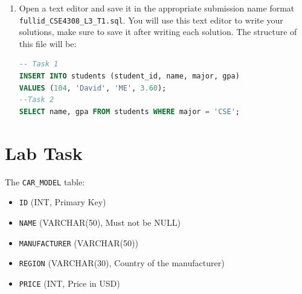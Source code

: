 \documentclass[12pt,a4paper]{article}
\begin{document}
\begin{enumerate}
After loading the SQL file, reconnect to PostgreSQL to verify that the tables have been created.

1. Reconnect to Your Database:

   \begin{lstlisting}[language=SQL]
   psql -h localhost -U student_12345 -d cse4308_12345
   \end{lstlisting}

2. Check Tables:

   Verify the tables have been created by listing them:

   \begin{lstlisting}[language=SQL]
   \dt
   \end{lstlisting}

3. View Table Data:

   Verify the data by running the following SQL queries:

   \begin{lstlisting}[language=SQL]
   SELECT * FROM <table_name>;
   \end{lstlisting}

\item Open a text editor and save it in the appropriate submission name format \\ \texttt{fullid\_CSE4308\_L3\_T1.sql}. You will use this text editor to write your solutions, make sure to save it after writing each solution. The structure of this file will be:
\begin{lstlisting}[language=SQL]
-- Task 1
INSERT INTO students (student_id, name, major, gpa)
VALUES (104, 'David', 'ME', 3.60);
--Task 2
SELECT name, gpa FROM students WHERE major = 'CSE';
\end{lstlisting}
\end{enumerate}
\newpage
\section{Lab Task}
The \texttt{CAR\_MODEL} table:
\begin{itemize}
        \item \texttt{ID} (INT, Primary Key)
        \item \texttt{NAME} (VARCHAR(50), Must not be NULL)
        \item \texttt{MANUFACTURER} (VARCHAR(50))
        \item \texttt{REGION} (VARCHAR(30), Country of the manufacturer)
        \item \texttt{PRICE} (INT, Price in USD)
\end{itemize}
\end{document}
